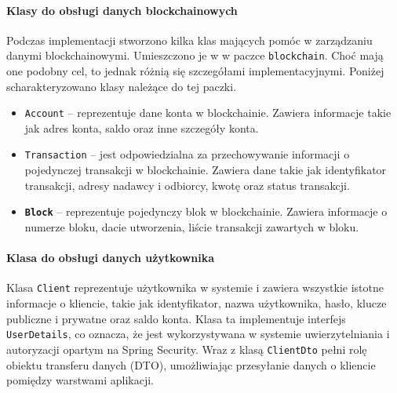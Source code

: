 \paragraph{Klasy do obsługi danych blockchainowych}
Podczas implementacji stworzono kilka klas mających pomóc w zarządzaniu danymi blockchainowymi. Umieszczono je w w paczce \texttt{blockchain}.
Choć mają one podobny cel, to jednak różnią się szczegółami implementacyjnymi. Poniżej scharakteryzowano klasy należące do tej paczki.
\begin{itemize}
\item \texttt{Account} -- reprezentuje dane konta w blockchainie. Zawiera informacje takie jak adres konta, saldo oraz inne szczegóły konta. 
\item \texttt{Transaction} -- jest odpowiedzialna za przechowywanie informacji o pojedynczej transakcji w blockchainie. Zawiera dane takie jak identyfikator transakcji, adresy nadawcy i odbiorcy, kwotę oraz status transakcji.
\item \textbf{\texttt{Block}} -- reprezentuje pojedynczy blok w blockchainie. Zawiera informacje o numerze bloku, dacie utworzenia, liście transakcji zawartych w bloku. 
\end{itemize}

\paragraph{Klasa do obsługi danych użytkownika}
Klasa \texttt{Client} reprezentuje użytkownika w systemie i zawiera wszystkie istotne informacje o kliencie, takie jak identyfikator, nazwa użytkownika, hasło, klucze publiczne i prywatne oraz saldo konta. Klasa ta implementuje interfejs \texttt{UserDetails}, co oznacza, że jest wykorzystywana w systemie uwierzytelniania i autoryzacji opartym na Spring Security. Wraz z klasą \texttt{ClientDto} pełni rolę obiektu transferu danych (DTO), umożliwiając przesyłanie danych o kliencie pomiędzy warstwami aplikacji.

